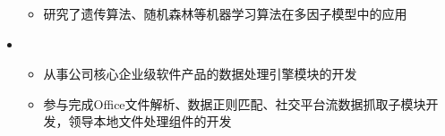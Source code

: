 \begin{itemize}[leftmargin=*]
{\begin{itemize}
        \item 研究了遗传算法、随机森林等机器学习算法在多因子模型中的应用
      \end{itemize}
      }
    \item
      {\small
      \begin{itemize}
        \item 从事公司核心企业级软件产品的数据处理引擎模块的开发
        \item 参与完成Office文件解析、数据正则匹配、社交平台流数据抓取子模块开发，领导本地文件处理组件的开发
      \end{itemize}
      }
  \end{itemize}